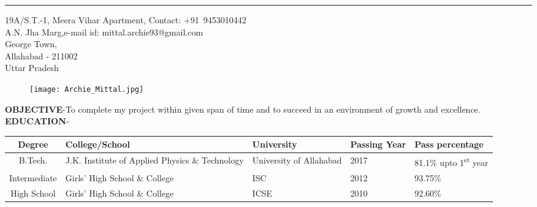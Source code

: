 \documentclass{article}
\begin{document}
	\begin{center}
		\huge{
			\rule[4mm]{\textwidth}{0.5mm}}
	\end{center}
	19A/S.T.-1, Meera Vihar Apartment, \hspace{4.22cm} Contact: \mbox{+91 9453010442}\\
	A.N. Jha Marg,\hfill e-mail id: mittal.archie93@gmail.com\\
	George Town,\\
	Allahabad - 211002\\
	Uttar Pradesh\\
	\begin{figure}[h]
		\hspace{10.1cm}
		\texttt{[image: Archie\_Mittal.jpg]}\\
	\end{figure}
	\textbf{OBJECTIVE}-To complete my project within given span of time and to succeed in an environment of growth and excellence.\\[\baselineskip]
	\textbf{EDUCATION}-
	\begin{tabular}{|c|p{5cm}|p{4cm}|p{2cm}|p{3cm}|}
		\hline
		\textbf{Degree} & \textbf{College/School} & \textbf{University} & \textbf{Passing Year} & \textbf{Pass percentage}\\
		\hline
		B.Tech. & J.K. Institute of Applied Physics \& Technology & University of Allahabad & 2017 & 81.1\% upto 1\textsuperscript{st} year\\
		\hline
		Intermediate & Girls' High School \& College & ISC & 2012 & 93.75\%\\
		\hline
		High School & Girls' High School \& College & ICSE & 2010 & 92.60\%\\
		\hline
	\end{tabular}
\end{document}
